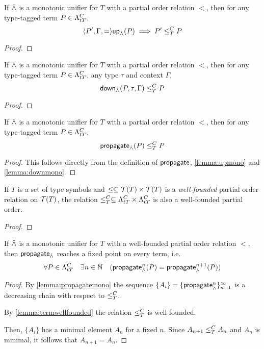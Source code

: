 \documentclass[main.tex]{subfiles}
\begin{document}
\begin{lemma}\label{lemma:upmono}
    If $\unify$ is a monotonic unifier for $T$ with a
    partial order relation $\less$, then for any type-tagged term
    $P \in \ttlambda{T}{C}$, 
    \[ \ttt{P', \Gamma} = \mcf{up}_{\unify}(P) \implies P' \termless{T}{C} P \]
\end{lemma}
\begin{proof}
\end{proof}

\begin{lemma}\label{lemma:downmono}
    If $\unify$ is a monotonic unifier for $T$ with a
    partial order relation $\less$, then for any type-tagged term
    $P \in \ttlambda{T}{C}$, any type $\tau$ and context $\Gamma$,
    \[ \mcf{down}_{\unify}(P, \tau, \Gamma) \termless{T}{C} P \]
\end{lemma}
\begin{proof}
\end{proof}

\begin{lemma}\label{lemma:propagatemono}
    If $\unify$ is a monotonic unifier for $T$ with a
    partial order relation $\less$, then for any type-tagged term
    $P \in \ttlambda{T}{C}$, \[ \mcf{propagate}_{\unify}(P) \termless{T}{C} P \]
\end{lemma}
\begin{proof}
    This follows directly from the definition of $\mcf{propagate}$,
    \cref{lemma:upmono} and \cref{lemma:downmono}.
\end{proof}

\begin{lemma}\label{lemma:termwellfounded}
    If $T$ is a set of type symbols and $\less \subseteq \tclos{T} \times \tclos{T}$
    is a \emph{well-founded} partial order relation on $\tclos{T}$, the relation
    $\termless{T}{C} \subseteq \ttlambda{T}{C} \times \ttlambda{T}{C}$
    is also a well-founded partial order.
\end{lemma}
\begin{proof}
\end{proof}

\begin{prop}\label{prop:propagateterminates}
    If $\unify$ is a monotonic unifier for $T$ with a well-founded
    partial order relation $\less$, then
    $\mcf{propagate}_{\unify}$ reaches a fixed point on every term, i.e.
    \[ \forall P \in \ttlambda{T}{C} \quad \exists n \in \mathbb{N} \quad
        (\mcf{propagate}_{\unify}^n(P) = \mcf{propagate}_{\unify}^{n + 1}(P)) \]
\end{prop}
\begin{proof}
    By \cref{lemma:propagatemono} the sequence
    $\{ A_i \} = \{ \mcf{propagate}_{\unify}^{n} \}_{n = 1}^{\infty}$
    is a decreasing chain with respect to $\termless{T}{C}$.

    By \cref{lemma:termwellfounded} the relation $\termless{T}{C}$ is well-founded.

    Then, $\{ A_i \}$ has a minimal element $A_n$ for a fixed $n$. Since
    $A_{n + 1} \termless{T}{C} A_n$ and $A_n$ is minimal, it follows that
    $A_{n + 1} = A_n$.
\end{proof}

  \newpage
\end{document}
